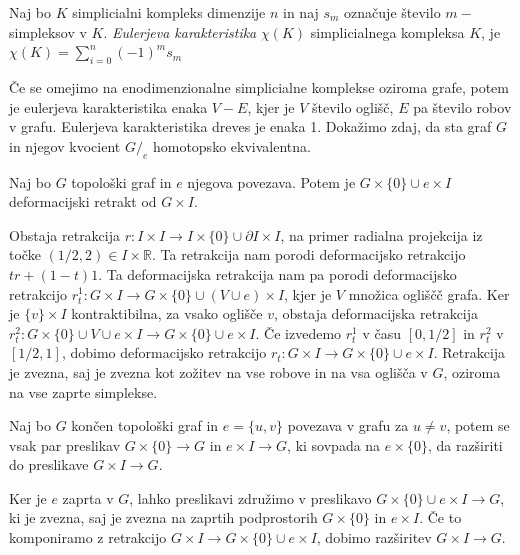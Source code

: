 \documentclass[mat1]{fmfdelo}
\newcommand{\R}{\mathbb R}
\begin{document}
\begin{definicija}
    Naj bo $K$ simplicialni kompleks dimenzije $n$ in naj $s_m$ označuje število $m-$simpleksov v $K$.
    \textit{Eulerjeva karakteristika} $\chi(K)$ simplicialnega kompleksa $K$, je  $\chi(K)=\sum\limits_{i=0}^n (-1)^m s_m$
\end{definicija}

Če se omejimo na enodimenzionalne simplicialne komplekse oziroma grafe, 
potem je eulerjeva karakteristika enaka $V-E$, kjer je $V$ število 
oglišč, $E$ pa 
število robov v grafu. Eulerjeva karakteristika dreves je enaka 1. 
Dokažimo zdaj, da sta graf $G$ in njegov kvocient $G/_e$ homotopsko ekvivalentna.


\begin{trditev}
    Naj bo $G$ topološki graf in $e$ njegova povezava. Potem je
    $G\times \{0\}\cup e\times I$ deformacijski retrakt od $G\times I$.
\end{trditev}

\begin{dokaz}
    Obstaja retrakcija $r\colon  I\times I \rightarrow I\times \{0\} \cup \partial I \times I$, na primer radialna projekcija iz točke $(1/2,2)\in I\times \R$. Ta retrakcija nam porodi deformacijsko retrakcijo $tr+(1-t)1$. Ta deformacijska retrakcija nam pa porodi deformacijsko retrakcijo $r^1_t\colon G\times I \rightarrow G\times\{0\} \cup (V\cup e) \times I$, kjer je $V$ množica ogliščč grafa. Ker je $\{v\}\times I$ kontraktibilna, za vsako oglišče $v$, obstaja deformacijska retrakcija $r^2_t\colon  G\times\{0\} \cup {V\cup e \times I}\rightarrow G\times\{0\} \cup { e \times I}$. Če izvedemo $r_t^1$ v času $[0,1/2]$ in $r^2_t$ v $[1/2,1]$, dobimo deformacijsko retrakcijo $r_t\colon G\times I \rightarrow G\times\{0\} \cup {e \times I}$. Retrakcija je zvezna, saj je zvezna kot zožitev na vse robove in na vsa oglišča v $G$, oziroma na vse zaprte simplekse.
\end{dokaz}

\begin{trditev}
    Naj bo $G$ končen topološki graf in  $e=\{u,v\}$ povezava v grafu za $u\neq v$, potem se vsak par preslikav $G\times \{0\}\rightarrow G$ in $e\times I \rightarrow G$, ki sovpada na $e\times \{0\}$, da razširiti do preslikave $G\times I \rightarrow G$.
\end{trditev}

\begin{dokaz}
    Ker je $e$ zaprta v $G$, lahko preslikavi združimo v preslikavo $G\times \{0\}\cup e\times I\rightarrow G$, ki je zvezna, saj je zvezna na zaprtih podprostorih $G\times \{0\}$ in $e\times I$. Če to komponiramo z retrakcijo $G\times I \rightarrow G\times \{0\}\cup e\times I$, dobimo razširitev $G\times I \rightarrow G.$
\end{dokaz}
\end{document}
